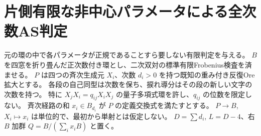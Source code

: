 \section{片側有限な非中心パラメータによる全次数AS判定}
\label{sec:onesided-parameter-cutoff}
元の環の中で各パラメータが正規であることすら要しない有限判定を与える。
$B$ を四窓を折り畳んだ正次数付き環とし、二次双対の標準有限Frobenius検査を済ませる。
$P$ は四つの斉次生成元 $X_i$、次数 $d_i>0$ を持つ既知の重み付き反復Ore拡大とする。
各段の自己同型は次数を保ち、捩れ導分はその段の新しい文字の次数を持つ。
特に $X_jX_i=q_{ij}X_iX_j$ の量子多項式環を許し、$q_{ij}$ の位数を限定しない。
斉次経路の和 $x_i\in B_{d_i}$ が $P$ の定義交換式を満たすとする。
$P\to B$, $X_i\mapsto x_i$ は単位的で、最初から単射とは仮定しない。
$D=\sum d_i$, $L=D-4$、右 $B$ 加群 $Q=B/(\sum_i x_i B)$ と置く。

